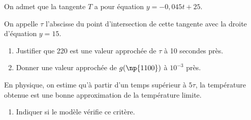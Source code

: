 		On admet que la tangente $T$ a pour équation $y=-0,045 t+25$.

		On appelle $\tau$ l'abscisse du point d'intersection de cette tangente avec la droite d'équation $y=15$.
	\begin{enumerate}[resume]
		\item Justifier que 220 est une valeur approchée de $\tau$ à 10 secondes près.

		\item Donner une valeur approchée de $g(\np{1100})$ à $10^{-3}$ près.
	\end{enumerate}

	En physique, on estime qu'à partir d'un temps supérieur à $5 \tau$, la température obtenue est une bonne approximation de la température limite.

	\begin{enumerate}[resume]
		\item Indiquer si le modèle vérifie ce critère.
	\end{enumerate}

